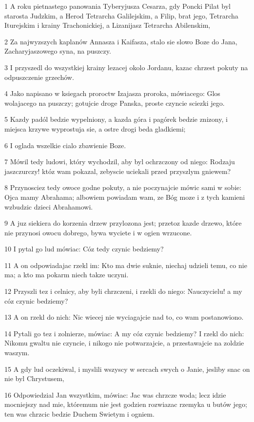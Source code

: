 \par 1 A roku pietnastego panowania Tyberyjusza Cesarza, gdy Poncki Pilat byl starosta Judzkim, a Herod Tetrarcha Galilejskim, a Filip, brat jego, Tetrarcha Iturejskim i krainy Trachonickiej, a Lizanijasz Tetrarcha Abilenskim,
\par 2 Za najwyzszych kaplanów Annasza i Kaifasza, stalo sie slowo Boze do Jana, Zacharyjaszowego syna, na puszczy.
\par 3 I przyszedl do wszystkiej krainy lezacej okolo Jordanu, kazac chrzest pokuty na odpuszczenie grzechów.
\par 4 Jako napisano w ksiegach proroctw Izajasza proroka, mówiacego: Glos wolajacego na puszczy; gotujcie droge Panska, proste czyncie sciezki jego.
\par 5 Kazdy padól bedzie wypelniony, a kazda góra i pagórek bedzie znizony, i miejsca krzywe wyprostuja sie, a ostre drogi beda gladkiemi;
\par 6 I oglada wszelkie cialo zbawienie Boze.
\par 7 Mówil tedy ludowi, który wychodzil, aby byl ochrzczony od niego: Rodzaju jaszczurczy! któz wam pokazal, zebyscie uciekali przed przyszlym gniewem?
\par 8 Przynosciez tedy owoce godne pokuty, a nie poczynajcie mówic sami w sobie: Ojca mamy Abrahama; albowiem powiadam wam, ze Bóg moze i z tych kamieni wzbudzic dzieci Abrahamowi.
\par 9 A juz siekiera do korzenia drzew przylozona jest; przetoz kazde drzewo, które nie przynosi owocu dobrego, bywa wyciete i w ogien wrzucone.
\par 10 I pytal go lud mówiac: Cóz tedy czynic bedziemy?
\par 11 A on odpowiadajac rzekl im: Kto ma dwie suknie, niechaj udzieli temu, co nie ma; a kto ma pokarm niech takze uczyni.
\par 12 Przyszli tez i celnicy, aby byli chrzczeni, i rzekli do niego: Nauczycielu! a my cóz czynic bedziemy?
\par 13 A on rzekl do nich: Nic wiecej nie wyciagajcie nad to, co wam postanowiono.
\par 14 Pytali go tez i zolnierze, mówiac: A my cóz czynic bedziemy? I rzekl do nich: Nikomu gwaltu nie czyncie, i nikogo nie potwarzajcie, a przestawajcie na zoldzie waszym.
\par 15 A gdy lud oczekiwal, i myslili wszyscy w sercach swych o Janie, jesliby snac on nie byl Chrystusem,
\par 16 Odpowiedzial Jan wszystkim, mówiac: Jac was chrzcze woda; lecz idzie mocniejszy nad mie, któremum nie jest godzien rozwiazac rzemyka u butów jego; ten was chrzcic bedzie Duchem Swietym i ogniem.
